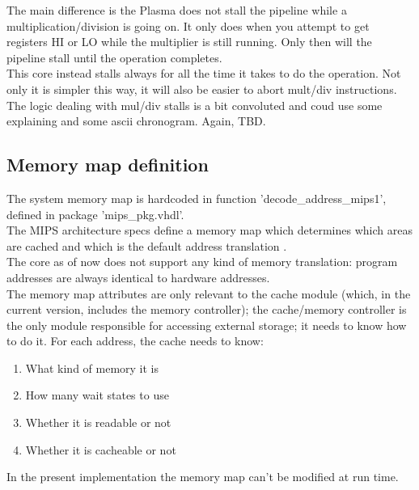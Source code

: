 \documentclass[11pt]{article}
\begin{document}
    The main difference is the Plasma does not stall the pipeline while a 
    multiplication/division is going on. It only does when you attempt to get 
    registers HI or LO while the multiplier is still running. Only then will
    the pipeline stall until the operation completes.\\
    This core instead stalls always for all the time it takes to do the 
    operation. Not only it is simpler this way, it will also be easier to 
    abort mult/div instructions.\\
    
    The logic dealing with mul/div stalls is a bit convoluted and coud use some
    explaining and some ascii chronogram. Again, TBD.\\
    
    
\subsection{Memory map definition}
\label{memory_map_definition}

    The system memory map is hardcoded in function 'decode\_address\_mips1', 
    defined in package 'mips\_pkg.vhdl'.\\

    The MIPS architecture specs define a memory map which determines which areas
    are cached and which is the default address translation \cite[p.~2-8]{r3k_ref_man}.\\
    
    The core as of now does not support any kind of memory translation: program 
    addresses are always identical to hardware addresses.\\
    The memory map attributes are only relevant to the cache module (which, in
    the current version, includes the memory controller); the cache/memory controller 
    is the only module responsible for accessing external storage; it needs to 
    know how to do it. For each address, the cache needs to know:

\begin{enumerate}
    \item What kind of memory it is
    \item How many wait states to use
    \item Whether it is readable or not
    \item Whether it is cacheable or not
\end{enumerate}
        
    In the present implementation the memory map can't be modified at run time.\\
        
\end{document}
